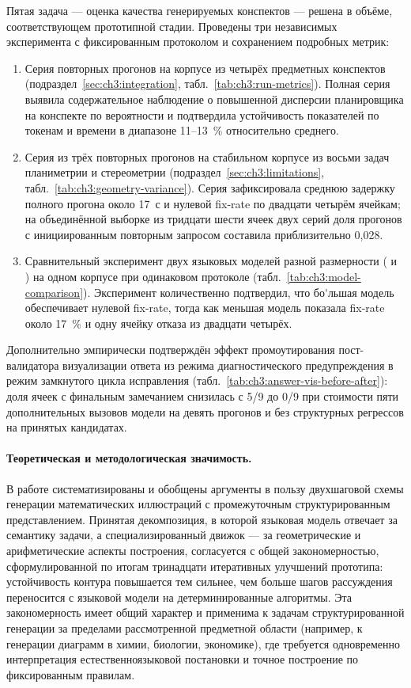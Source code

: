 Пятая задача --- оценка качества генерируемых конспектов --- решена
в объёме, соответствующем прототипной стадии. Проведены три независимых
эксперимента с фиксированным протоколом и сохранением подробных метрик:
\begin{enumerate}
    \item Серия повторных прогонов на корпусе из четырёх предметных
    конспектов (подраздел~\ref{sec:ch3:integration},
    табл.~\ref{tab:ch3:run-metrics}). Полная серия выявила содержательное
    наблюдение о повышенной дисперсии планировщика на конспекте по
    вероятности и подтвердила устойчивость показателей по токенам и
    времени в диапазоне 11--13~\% относительно среднего.
    \item Серия из трёх повторных прогонов на стабильном корпусе из
    восьми задач планиметрии и стереометрии
    (подраздел~\ref{sec:ch3:limitations},
    табл.~\ref{tab:ch3:geometry-variance}). Серия зафиксировала среднюю
    задержку полного прогона около 17~с и нулевой fix\nobreakdash-rate
    по двадцати четырём ячейкам; на объединённой выборке из тридцати
    шести ячеек двух серий доля прогонов с инициированным повторным
    запросом составила приблизительно 0{,}028.
    \item Сравнительный эксперимент двух языковых моделей разной
    размерности ( и
    ) на одном корпусе при одинаковом
    протоколе (табл.~\ref{tab:ch3:model-comparison}). Эксперимент
    количественно подтвердил, что бо\'{}льшая модель обеспечивает нулевой
    fix\nobreakdash-rate, тогда как меньшая модель показала
    fix\nobreakdash-rate около 17~\% и одну ячейку отказа из двадцати
    четырёх.
\end{enumerate}
Дополнительно эмпирически подтверждён эффект промоутирования
пост\nobreakdash-валидатора визуализации ответа из режима диагностического
предупреждения в режим замкнутого цикла исправления
(табл.~\ref{tab:ch3:answer-vis-before-after}): доля ячеек с финальным
замечанием снизилась с 5/9 до 0/9 при стоимости пяти дополнительных
вызовов модели на девять прогонов и без структурных регрессов на принятых
кандидатах.

\paragraph{Теоретическая и методологическая значимость.}
В работе систематизированы и обобщены аргументы в пользу двухшаговой
схемы генерации математических иллюстраций с промежуточным
структурированным представлением. Принятая декомпозиция, в которой
языковая модель отвечает за семантику задачи, а специализированный движок
--- за геометрические и арифметические аспекты построения, согласуется с
общей закономерностью, сформулированной по итогам тринадцати
итеративных улучшений прототипа: устойчивость контура повышается тем
сильнее, чем больше шагов рассуждения переносится с языковой модели на
детерминированные алгоритмы. Эта закономерность имеет общий характер и
применима к задачам структурированной генерации за пределами
рассмотренной предметной области (например, к генерации диаграмм в
химии, биологии, экономике), где требуется одновременно интерпретация
естественноязыковой постановки и точное построение по фиксированным
правилам.

